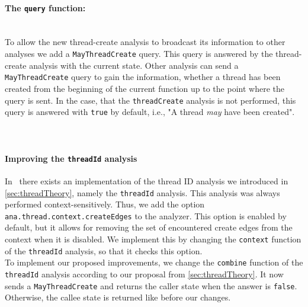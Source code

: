     \paragraph{The \texttt{query} function:}\mbox{}\\
    To allow the new thread-create analysis to broadcast its information to other analyses we add a \texttt{MayThreadCreate} query. This query is answered by the thread-create analysis with the current state. Other analysis can send a \texttt{MayThreadCreate} query to gain the information, whether a thread has been created from the beginning of the current function up to the point where the query is sent. In the case, that the \texttt{threadCreate} analysis is not performed, this query is answered with \texttt{true} by default, i.e., "A thread \textit{may} have been created".\\
    \\
    \\
    \paragraph{Improving the \texttt{threadId} analysis}
    In \gob\ there exists an implementation of the thread ID analysis we introduced in \autoref{sec:threadTheory}, namely the \texttt{threadId} analysis. This analysis was always performed context-sensitively. Thus, we add the option \texttt{ana.thread.context.createEdges} to the analyzer. This option is enabled by default, but it allows for removing the set of encountered create edges from the context when it is disabled. We implement this by changing the \texttt{context} function of the \texttt{threadId} analysis, so that it checks this option.\\
    To implement our proposed improvements, we change the \texttt{combine} function of the \texttt{threadId} analysis according to our proposal from \autoref{sec:threadTheory}. It now sends a \texttt{MayThreadCreate} and returns the caller state when the answer is \texttt{false}. Otherwise, the callee state is returned like before our changes.

